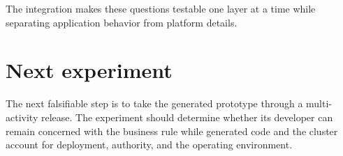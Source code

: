The integration makes these questions testable one layer at a time while
separating application behavior from platform details.

\section{Next experiment}

The next falsifiable step is to take the generated prototype through a
multi-activity release. The experiment should determine whether its developer
can remain concerned with the business rule while generated code and the
cluster account for deployment, authority, and the operating environment.

\endinput
